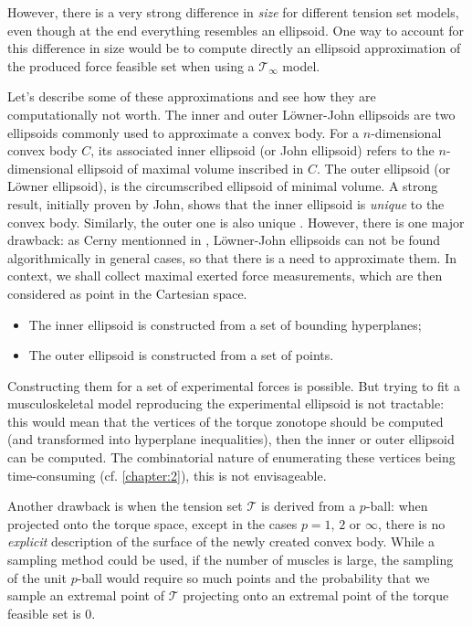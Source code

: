 However, there is a very strong difference in \emph{size} for different tension set models, even though at the end everything resembles an ellipsoid. One way to account for this difference in size would be to compute directly an ellipsoid approximation of the produced force feasible set when using a $\mathcal{T}_{\infty}$ model. 

Let's describe some of these approximations and see how they are computationally not worth. The inner and outer Löwner-John ellipsoids are two ellipsoids commonly used to approximate a convex body. For a $n$-dimensional convex body $C$, its associated inner ellipsoid (or John ellipsoid) refers to the $n$-dimensional ellipsoid of maximal volume inscribed in $C$. The outer ellipsoid (or Löwner ellipsoid), is the circumscribed ellipsoid of minimal volume.
A strong result, initially proven by John, shows that the inner ellipsoid is \emph{unique} to the convex body. Similarly, the outer one is also unique \cite{henkLownerJohnEllipsoids2012}. However, there is one major drawback: as Cerny mentionned in \cite{cernyGoffinAlgorithmZonotopes2012}, Löwner-John ellipsoids can not be found algorithmically in general cases, so that there is a need to approximate them. In context, we shall collect maximal exerted force measurements, which are then considered as point in the Cartesian space.
\begin{itemize}[noitemsep]
    \item The inner ellipsoid is constructed from a set of bounding hyperplanes;
    \item The outer ellipsoid is constructed from a set of points.
\end{itemize}

Constructing them for a set of experimental forces is possible. But trying to fit a musculoskeletal model reproducing the experimental ellipsoid is not tractable: this would mean that the vertices of the torque zonotope should be computed (and transformed into hyperplane inequalities), then the inner or outer ellipsoid can be computed. The combinatorial nature of enumerating these vertices being time-consuming (cf. \ref{chapter:2}), this is not envisageable.

Another drawback is when the tension set $\mathcal{T}$ is derived from a $p$-ball: when projected onto the torque space, except in the cases $p=1,\,2$ or $\infty$, there is no \emph{explicit} description of the surface of the newly created convex body. While a sampling method could be used, if the number of muscles is large, the sampling of the unit $p$-ball would require so much points and the probability that we sample an extremal point of $\mathcal{T}$ projecting onto an extremal point of the torque feasible set is 0.

